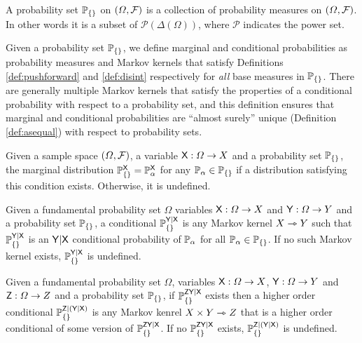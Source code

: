 \begin{definition}
A probability set $\mathbb{P}_{\{\}}$ on $(\Omega,\mathcal{F})$ is a collection of probability measures on $(\Omega,\mathcal{F})$. In other words it is a subset of $\mathscr{P}(\Delta(\Omega))$, where $\mathscr{P}$ indicates the power set.
\end{definition}

Given a probability set $\mathbb{P}_{\{\}}$, we define marginal and conditional probabilities as probability measures and Markov kernels that satisfy Definitions \ref{def:pushforward} and \ref{def:disint} respectively for \emph{all} base measures in $\mathbb{P}_{\{\}}$. There are generally multiple Markov kernels that satisfy the properties of a conditional probability with respect to a probability set, and this definition ensures that marginal and conditional probabilities are ``almost surely'' unique (Definition \ref{def:asequal}) with respect to probability sets.

\begin{definition}
Given a sample space $(\Omega,\mathcal{F})$, a variable $\mathsf{X}:\Omega\to X$ and a probability set $\mathbb{P}_{\{\}}$, the marginal distribution $\mathbb{P}_{\{\}}^{\mathsf{X}}=\mathbb{P}_\alpha^{\mathsf{X}}$ for any $\mathbb{P}_\alpha\in\mathbb{P}_{\{\}}$ if a distribution satisfying this condition exists. Otherwise, it is undefined.
\end{definition}

\begin{definition}\label{def:cprob_pset}
Given a fundamental probability set $\Omega$ variables $\mathsf{X}:\Omega\to X$ and $\mathsf{Y}:\Omega\to Y$ and a probability set $\mathbb{P}_{\{\}}$, a conditional $\mathbb{P}_{\{\}}^{\mathsf{Y}|\mathsf{X}}$ is any Markov kernel $X\rightarrowtriangle Y$ such that $\mathbb{P}_{\{\}}^{\mathsf{Y}|\mathsf{X}}$ is an $\mathsf{Y}|\mathsf{X}$ conditional probability of $\mathbb{P}_\alpha$ for all $\mathbb{P}_\alpha\in \mathbb{P}_{\{\}}$. If no such Markov kernel exists, $\mathbb{P}_{\{\}}^{\mathsf{Y}|\mathsf{X}}$ is undefined.
\end{definition}

\begin{definition}\label{def:ho_cprob_pset}
Given a fundamental probability set $\Omega$, variables $\mathsf{X}:\Omega\to X$, $\mathsf{Y}:\Omega\to Y$ and $\mathsf{Z}:\Omega\to Z$ and a probability set $\mathbb{P}_{\{\}}$, if $\mathbb{P}_{\{\}}^{\mathsf{ZY}|\mathsf{X}}$ exists then a higher order conditional $\mathbb{P}_{\{\}}^{\mathsf{Z}|(\mathsf{Y}|\mathsf{X})}$ is any Markov kenrel $X\times Y\rightarrowtriangle Z$ that is a higher order conditional of some version of $\mathbb{P}_{\{\}}^{\mathsf{ZY}|\mathsf{X}}$. If no $\mathbb{P}_{\{\}}^{\mathsf{ZY}|\mathsf{X}}$ exists, $\mathbb{P}_{\{\}}^{\mathsf{Z}|(\mathsf{Y}|\mathsf{X})}$ is undefined.
\end{definition}


